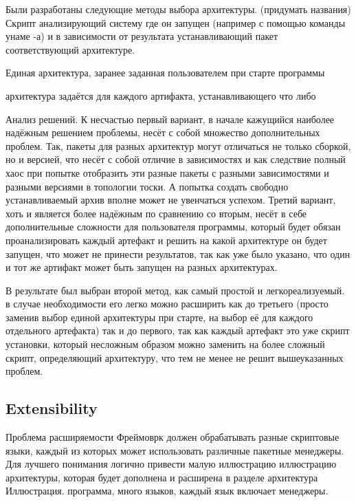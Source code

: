 Были разработаны следующие методы выбора архитектуры. 
(придумать названия)
Скрипт анализирующий систему где он запущен (например с помощью команды унаме -а) и в зависимости от результата устанавливающий пакет соответствующий архитектуре. 

Единая архитектура, заранее заданная пользователем при старте программы

архитектура задаётся для каждого артифакта, устанавливающего что либо

Анализ решений. К несчастью первый вариант, в начале кажущийся наиболее надёжным решением проблемы, несёт с собой множество дополнительных проблем. Так, пакеты для разных архитектур могут отличаться не только сборкой, но и версией, что несёт с собой отличие в зависимостях и как следствие полный хаос при попытке отобразить эти разные пакеты с разными зависимостями и разными версиями в топологии тоски. А попытка создать свободно устанавливаемый архив вполне может не увенчаться успехом. 
Третий вариант, хоть и является более надёжным по сравнению со вторым, несёт в себе дополнительные сложности для пользователя программы, который будет обязан проанализировать каждый артефакт и решить на какой архитектуре он будет запущен, что может не принести результатов, так как уже было указано, что один и тот же артифакт может быть запущен на разных архитектурах.

В результате был выбран второй метод, как самый простой и легкореализуемый. в случае необходимости его легко можно расширить как до третьего (просто заменив выбор единой архитектуры при старте, на выбор её для каждого отдельного артефакта) так и до первого, так как каждый артефакт это уже скрипт установки, который несложным образом можно заменить на более сложный скрипт, определяющий архитектуру, что тем не менее не решит вышеуказанных проблем.


\fi
\subsection{Extensibility}
Проблема расширяемости
Фреймоврк должен обрабатывать разные скриптовые языки, каждый из которых может использовать различные пакетные менеджеры.
Для лучшего понимания логично привести малую иллюстрацию иллюстрацию архитектуры, которая будет дополнена и расширена в разделе архитектура
Иллюстрация. программа, много языков, каждый язык включает менеджеры.

\fi
